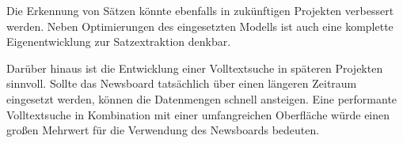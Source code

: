 Die Erkennung von Sätzen könnte ebenfalls in zukünftigen Projekten verbessert werden. Neben
Optimierungen des eingesetzten Modells ist auch eine komplette Eigenentwicklung zur
Satzextraktion denkbar.

Darüber hinaus ist die Entwicklung einer Volltextsuche in späteren Projekten sinnvoll. 
Sollte das Newsboard tatsächlich über einen längeren Zeitraum eingesetzt werden, 
können die Datenmengen schnell ansteigen. Eine performante Volltextsuche in Kombination mit 
einer umfangreichen Oberfläche würde einen großen Mehrwert für die Verwendung des Newsboards
bedeuten.
